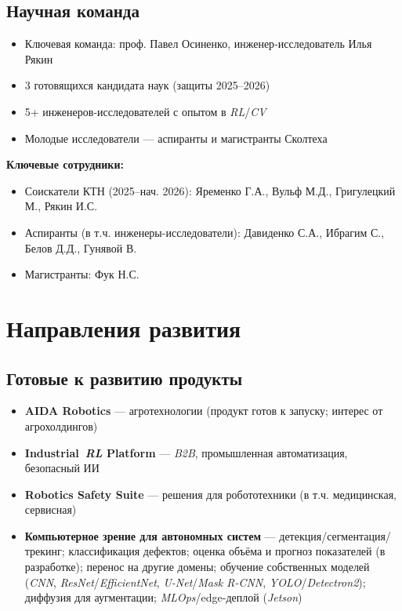 \documentclass[12pt,a4paper]{article}
\begin{document}
\subsection*{Научная команда}
\begin{itemize}
    \item Ключевая команда: проф. Павел Осиненко, инженер‑исследователь Илья Рякин
    \item 3 готовящихся кандидата наук (защиты 2025–2026)
    \item 5+ инженеров‑исследователей с опытом в \textit{RL}/\textit{CV}
    \item Молодые исследователи — аспиранты и магистранты Сколтеха
\end{itemize}
\textbf{Ключевые сотрудники:}
\begin{itemize}
    \item Соискатели КТН (2025–нач. 2026): Яременко Г.А., Вульф М.Д., Григулецкий М., Рякин И.С.
    \item Аспиранты (в т.ч. инженеры-исследователи): Давиденко С.А., Ибрагим С., Белов Д.Д., Гунявой В.
    \item Магистранты: Фук Н.С.
\end{itemize}

\section{Направления развития}
\subsection*{Готовые к развитию продукты}
\begin{itemize}
    \item \textbf{AIDA Robotics} --- агротехнологии (продукт готов к запуску; интерес от агрохолдингов)
    \item \textbf{Industrial~\textit{RL} Platform} --- \textit{B2B}, промышленная автоматизация, безопасный ИИ
    \item \textbf{Robotics Safety Suite} --- решения для робототехники (в т.ч. медицинская, сервисная)
    \item \textbf{Компьютерное зрение для автономных систем} --- детекция/сегментация/трекинг; классификация дефектов; оценка объёма и прогноз показателей (в разработке); перенос на другие домены; обучение собственных моделей (\textit{CNN}, \textit{ResNet}/\textit{EfficientNet}, \textit{U-Net}/\textit{Mask R-CNN}, \textit{YOLO}/\textit{Detectron2}); диффузия для аугментации; \textit{MLOps}/edge-деплой (\textit{Jetson})
\end{itemize}
\end{document}
